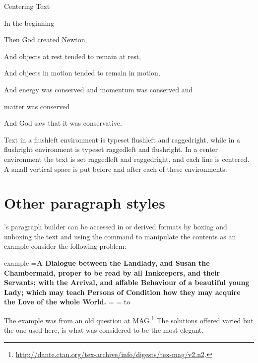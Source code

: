 \begin{texexample}{Centering Text}{}
\begin{center}
In the beginning

Then God created Newton,

And objects at rest tended to remain at rest,

And objects in motion tended to remain in motion,

And energy was conserved and momentum was conserved and

matter was conserved

And God saw that it was conservative.
\end{center}
\end{texexample}


Text in a flushleft environment is typeset flushleft and raggedright, while in a
flushright environment is typeset raggedleft and flushright. In a center environment
the text is set raggedleft and raggedright, and each line is centered. A small vertical space
is put before and after each of these environments.


\section{Other paragraph styles}

\tex's paragraph builder can be accessed in \tex or \latex derived formats by boxing and unboxing the text and using the command \cmd{\lastbox} to manipulate the contents as an example consider the following problem:

\def\weirdtitle#1{%
       \bgroup
       \setbox0=\vbox{\bf\noindent #1}%
       \setbox1=\vbox{%
            \unvbox0
            \setbox2=\lastbox
            \hbox to \linewidth{\hfill\unhbox2 \hfill}%
       }%
      \egroup
  }%

\begin{scriptexample}{example}{}
\weirdtitle{A Dialogue between the Landlady, and Susan the Chambermaid, proper to be
read by all Innkeepers, and their Servants; with the Arrival, and
affable Behaviour of a beautiful young Lady; which may teach Persons of
Condition how they may acquire the Love of the whole World.}
\end{scriptexample}

The example was from an old question at \tex{}MAG.\footnote{\url{http://dante.ctan.org/tex-archive/info/digests/tex-mag/v2.n2}.} The solutions offered varied but the one used here, is what was considered to be the most elegant. 

